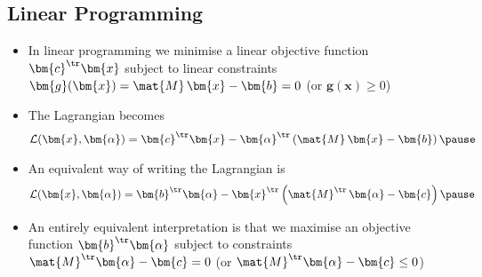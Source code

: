 \begin{slide}
\section[-2]{Linear Programming}

\begin{PauseHighLight}
  \begin{itemize}
  \item In linear programming we minimise a linear objective function
    $\bm{c}^\tr \bm{x}$ subject to linear constraints $\bm{g}(\bm{x}) =
    \mat{M}\, \bm{x} - \bm{b} =0$ (or $\bm{g}(\bm{x})\geq0$)\pause
  \item The Lagrangian becomes
    \begin{align*}
      \mathcal{L}(\bm{x},\bm{\alpha}) = \bm{c}^\tr \bm{x} - \bm{\alpha}^\tr
      \left( \mat{M}\, \bm{x} - \bm{b} \right) \pause
    \end{align*}
  \item An equivalent way of writing the Lagrangian is
    \begin{align*}
      \mathcal{L}(\bm{x},\bm{\alpha}) 
      = \bm{b}^\tr\bm{\alpha} - \bm{x}^\tr\left( \mat{M}^\tr\, \bm{\alpha}
      - \bm{c}\right)\pause
    \end{align*}
  \item An entirely equivalent interpretation is that we maximise an
    objective function $\bm{b}^\tr\bm{\alpha}$ subject to constraints
    $\mat{M}^\tr \bm{\alpha} - \bm{c} = 0$ (or $\mat{M}^\tr
    \bm{\alpha} - \bm{c} \leq 0$)\pause
  \end{itemize}
\end{PauseHighLight}

\end{slide}



